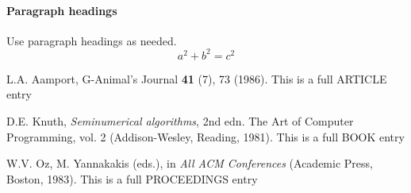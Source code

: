 \documentclass{svjour3}                     %
\begin{document}
\paragraph{Paragraph headings} Use paragraph headings as needed.
\begin{equation}
a^2+b^2=c^2
\end{equation}



\nocite{*}

\begin{thebibliography}{}
%
%
L.A. Aamport, \mbox{G-Animal's} Journal \textbf{41} (7), 73 (1986).
This is a full ARTICLE entry

D.E. Knuth, \textit{Seminumerical algorithms}, 2nd edn.
The Art of Computer Programming,
vol. 2 (Addison-Wesley, Reading, 1981).
This is a full BOOK entry


W.V. Oz, M. Yannakakis (eds.),
in \textit{All ACM Conferences} (Academic Press, Boston, 1983).
This is a full PROCEEDINGS entry
\end{thebibliography}
\end{document}
